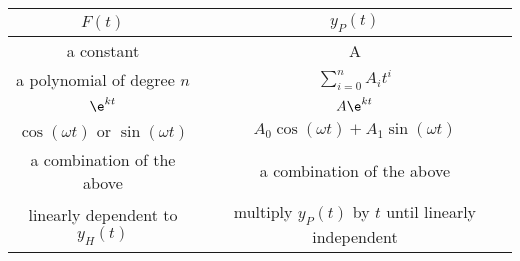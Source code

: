 \documentclass{article}
\begin{document}
\begin{table}[H]
    \centering
    \begin{tabular}{c c}
        \toprule
        \(F(t)\)                                                             & \(y_P(t)\)                                                                \\
        \midrule
        a constant                                                         & A                                                                       \\
        a polynomial of degree \(n\)                                         & \(\displaystyle \sum_{i = 0}^n A_i t^i\)                                  \\
        \(\e^{kt}\)                                                          & \(A \e^{kt}\)                                                             \\
        \(\cos{\left( \omega t \right)}\) or \(\sin{\left( \omega t \right)}\) & \(A_0 \cos{\left( \omega t \right)} + A_1 \sin{\left( \omega t \right)}\) \\
        a combination of the above                                         & a combination of the above                                              \\
        linearly dependent to \(y_H(t)\)                                     & multiply \(y_P(t)\) by \(t\) until linearly independent                     \\
        \bottomrule
    \end{tabular}
\end{table}
\end{document}
